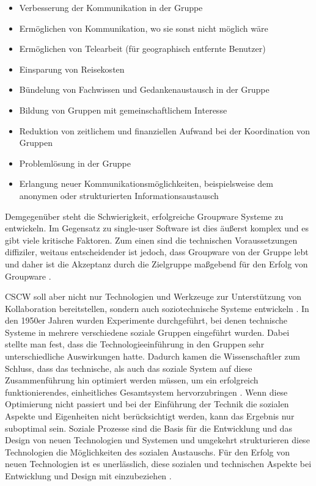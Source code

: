 	\begin{itemize}
		\item {Verbesserung der Kommunikation in der Gruppe}
		\item {Ermöglichen von Kommunikation, wo sie sonst nicht möglich wäre}
		\item {Ermöglichen von Telearbeit (für geographisch entfernte Benutzer)}
		\item {Einsparung von Reisekosten}
		\item {Bündelung von Fachwissen und Gedankenaustausch in der Gruppe}
		\item {Bildung von Gruppen mit gemeinschaftlichem Interesse}
		\item {Reduktion von zeitlichem und finanziellen Aufwand bei der Koordination von Gruppen}
		\item {Problemlösung in der Gruppe}
		\item {Erlangung neuer Kommunikationsmöglichkeiten, beispielsweise dem anonymen oder strukturierten Informationsaustausch}
	\end{itemize}
	\begin{flushright}
		\citep{Gerlicher:2007p241}
	\end{flushright}
	
	Demgegenüber steht die Schwierigkeit, erfolgreiche Groupware Systeme zu entwickeln. Im Gegensatz zu single-user Software ist dies äußerst komplex und es gibt viele kritische Faktoren. Zum einen sind die technischen Voraussetzungen diffiziler, weitaus entscheidender ist jedoch, dass Groupware von der Gruppe lebt und daher ist die Akzeptanz durch die Zielgruppe maßgebend für den Erfolg von Groupware \citep{Gerlicher:2007p241}.
	
	\medskip \ac{CSCW} soll aber nicht nur Technologien und Werkzeuge zur Unterstützung von Kollaboration bereitstellen, sondern auch soziotechnische Systeme entwickeln \citep{Koch2008}. In den 1950er Jahren wurden Experimente durchgeführt, bei denen technische Systeme in mehrere verschiedene soziale Gruppen eingeführt wurden. Dabei stellte man fest, dass die Technologieeinführung in den Gruppen sehr unterschiedliche Auswirkungen hatte. Dadurch kamen die Wissenschaftler zum Schluss, dass das technische, als auch das soziale System auf diese Zusammenführung hin optimiert werden müssen, um ein erfolgreich funktionierendes, einheitliches Gesamtsystem hervorzubringen \citep{Koch2008}. Wenn diese Optimierung nicht passiert und bei der Einführung der Technik die sozialen Aspekte und Eigenheiten nicht berücksichtigt werden, kann das Ergebnis nur suboptimal sein. Soziale Prozesse sind die Basis für die Entwicklung und das Design von neuen Technologien und Systemen und umgekehrt strukturieren diese Technologien die Möglichkeiten des sozialen Austauschs. Für den Erfolg von neuen Technologien ist es unerlässlich, diese sozialen und technischen Aspekte bei Entwicklung und Design mit einzubeziehen \citep{Mumford:2000}.
	

